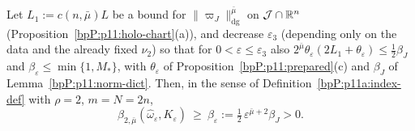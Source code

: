 \begin{lemma}\label{bpP:p11:amount}
Let $L_1:=c(n,\bar\mu)L$ be a bound for $\lVert\varpi_J\rVert^{\bar\mu}_{\mathrm{dg}}$ on $\mathcal J\cap\mathbb{R}^n$ (Proposition~\ref{bpP:p11:holo-chart}(a)), and decrease $\varepsilon_3$ (depending only on the data and the already fixed $\nu_2$) so that for $0<\varepsilon\le\varepsilon_3$ also $2^{\bar\mu}\theta_\varepsilon(2L_1+\theta_\varepsilon)\le\frac12\beta_J$ and $\beta_\varepsilon\le\min\{1,M_*\}$, with $\theta_\varepsilon$ of Proposition~\ref{bpP:p11:prepared}(c) and $\beta_J$ of Lemma~\ref{bpP:p11:norm-dict}. Then, in the sense of Definition~\ref{bpP:p11a:index-def} with $\rho=2$, $m=N=2n$,
\[\beta_{2,\bar\mu}(\hat\omega_\varepsilon,K_\varepsilon)\ \ge\ \beta_\varepsilon:=\tfrac12\,\varepsilon^{\bar\mu+2}\beta_J>0 .\]
\end{lemma}
